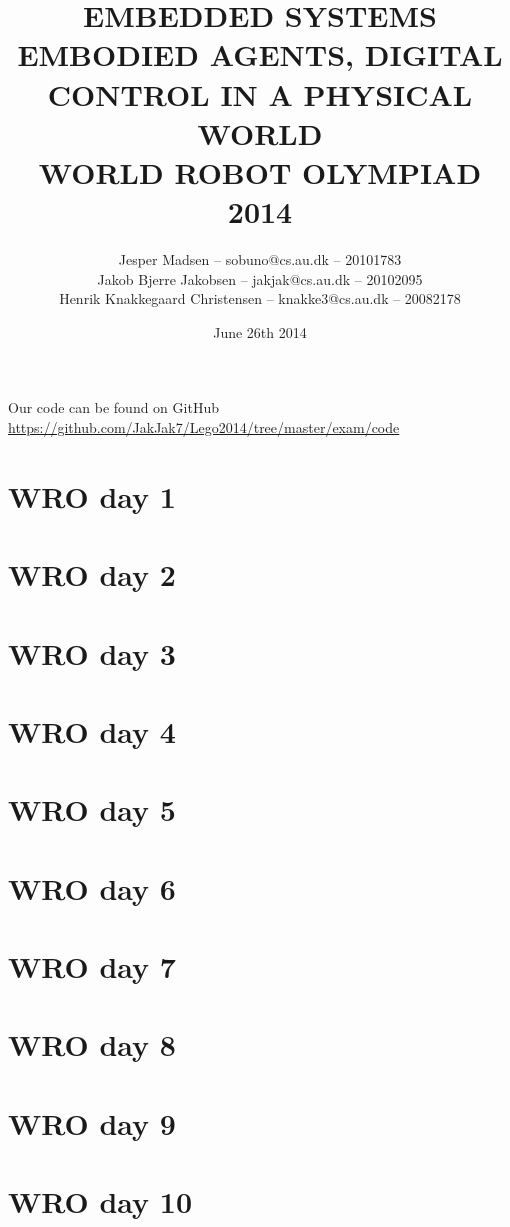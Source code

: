 \documentclass[a4paper,11pt,article,oneside]{memoir}
\title{EMBEDDED SYSTEMS\\\small{EMBODIED AGENTS, DIGITAL CONTROL IN A PHYSICAL WORLD\\WORLD ROBOT OLYMPIAD 2014}}
\author{Jesper Madsen -- sobuno@cs.au.dk -- 20101783\\Jakob Bjerre Jakobsen -- jakjak@cs.au.dk -- 20102095\\Henrik Knakkegaard Christensen -- knakke3@cs.au.dk -- 20082178}
\date{June 26th 2014}
\begin{document}
\maketitle
\newpage
Our code can be found on GitHub\\
\url{https://github.com/JakJak7/Lego2014/tree/master/exam/code}
\newpage
\setcounter{tocdepth}{3}
\tableofcontents
\clearpage
\section{WRO day 1}

\clearpage
\section{WRO day 2}

\clearpage
\section{WRO day 3}

\clearpage
\section{WRO day 4}

\clearpage
\section{WRO day 5}

\clearpage
\section{WRO day 6}

\clearpage
\section{WRO day 7}

\clearpage
\section{WRO day 8}

\clearpage
\section{WRO day 9}

\clearpage
\section{WRO day 10}

\clearpage
\end{document}
